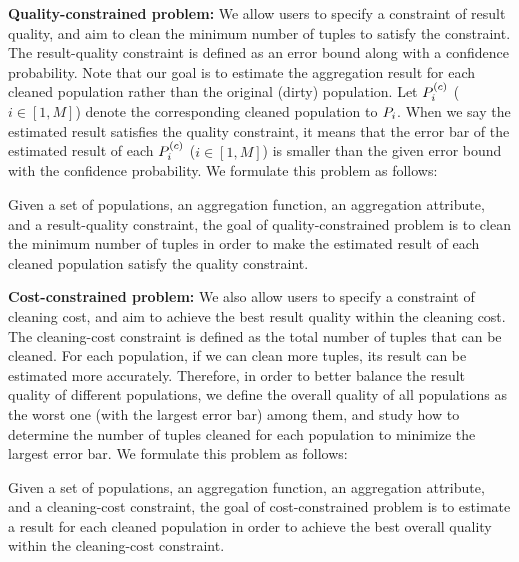 \vspace{.5em}

{\noindent \bf Quality-constrained problem:} We allow users to specify a constraint of result quality, and aim to clean the minimum number of tuples to satisfy the constraint. The result-quality constraint is defined as an error bound along with a confidence probability. Note that our goal is to estimate the aggregation result for each cleaned population rather than the original (dirty) population. Let $P^{(c)}_{i}$ ($i\in[1,M]$) denote the corresponding cleaned population to $P_{i}$. When we say the estimated result satisfies the quality constraint, it means that the error bar of the estimated result of each $P^{(c)}_{i}$ ($i\in[1,M]$) is smaller than the given error bound with the confidence probability. We formulate this problem as follows:

\begin{definition}
Given a set of populations, an aggregation function, an aggregation attribute, and a result-quality constraint, the goal of quality-constrained problem is to clean the minimum number of tuples in order to make the estimated result of each cleaned population satisfy the quality constraint.
\end{definition}


\vspace{.5em}

{\noindent \bf Cost-constrained problem:} We also allow users to specify a constraint of cleaning cost, and aim to achieve the best result quality within the cleaning cost. The cleaning-cost constraint is defined as the total number of tuples that can be cleaned. For each population, if we can clean more tuples, its result can be estimated more accurately. Therefore, in order to better balance the result quality of different populations, we define the overall quality of all populations as the worst one (with the largest error bar) among them, and study how to determine the number of tuples cleaned for each population to minimize the largest error bar. We formulate this problem as follows:



\begin{definition}
Given a set of populations, an aggregation function, an aggregation attribute, and a cleaning-cost constraint, the goal of cost-constrained problem is to estimate a result for each cleaned population in order to achieve the best overall quality within the cleaning-cost constraint.
\end{definition}


